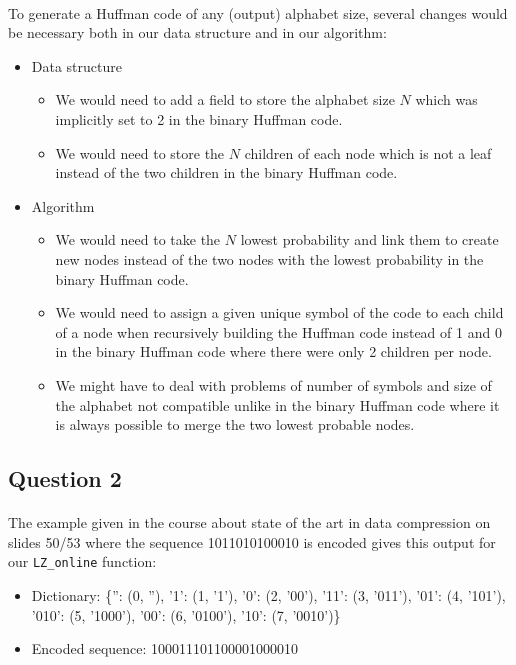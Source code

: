 \documentclass[a4paper, 11pt, oneside]{article}
\begin{document}
\paragraph{}To generate a Huffman code of any (output) alphabet size, several changes would be necessary both in our data structure and in our algorithm:
\begin{itemize}
    \item Data structure
        \begin{itemize}
            \item We would need to add a field to store the alphabet size $N$ which was implicitly set to 2 in the binary Huffman code.
            \item We would need to store the $N$ children of each node which is not a leaf instead of the two children in the binary Huffman code.
        \end{itemize}
    \item Algorithm
        \begin{itemize}
            \item We would need to take the $N$ lowest probability and link them to create new nodes instead of the two nodes with the lowest probability in the binary Huffman code.
            \item We would need to assign a given unique symbol of the code to each child of a node when recursively building the Huffman code instead of 1 and 0 in the binary Huffman code where there were only 2 children per node.
            \item We might have to deal with problems of number of symbols and size of the alphabet not compatible unlike in the binary Huffman code where it is always possible to merge the two lowest probable nodes. 
        \end{itemize}
\end{itemize}

\subsection{Question 2}

\paragraph{}The example given in the course about state of the art in data compression on slides 50/53 where the sequence 1011010100010 is encoded gives this output for our \texttt{LZ\_online} function:
\begin{itemize}
    \item Dictionary: \{'': (0, ''), '1': (1, '1'), '0': (2, '00'), '11': (3, '011'), '01': (4, '101'), '010': (5, '1000'), '00': (6, '0100'), '10': (7, '0010')\}
    \item Encoded sequence: 100011101100001000010
\end{itemize}
\end{document}
